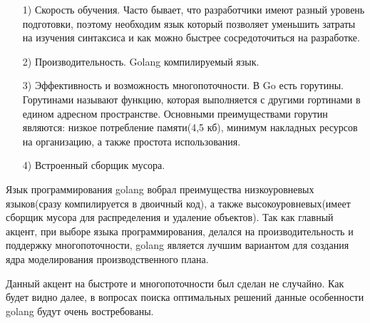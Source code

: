 \begin{itemize}
    \item [1)] Скорость обучения. Часто бывает, что разработчики имеют разный уровень подготовки, поэтому необходим язык который позволяет уменьшить затраты на изучения синтаксиса и как можно быстрее сосредоточиться на разработке. 
    \item [2)] Производительность. Golang компилируемый язык. 
    \item [3)] Эффективность и возможность многопоточности. В Go есть горутины. Горутинами называют функцию, которая выполняется с другими гортинами в едином адресном пространстве. Основными преимуществами горутин являются: низкое потребление памяти(4,5 кб), минимум накладных ресурсов на организацию, а также простота использования.
    \item [4)] Встроенный сборщик мусора.
\end{itemize}

Язык программирования golang вобрал преимущества низкоуровневых языков(сразу компилируется в двоичный код), а также высокоуровневых(имеет сборщик мусора для распределения и удаление объектов). Так как главный акцент, при выборе языка программирования, делался на производительность и поддержку многопоточности, golang является лучшим вариантом для создания ядра моделирования производственного плана. 

Данный акцент на быстроте и многопоточности был сделан не случайно. Как будет видно далее, в вопросах поиска оптимальных решений данные особенности golang будут очень востребованы.